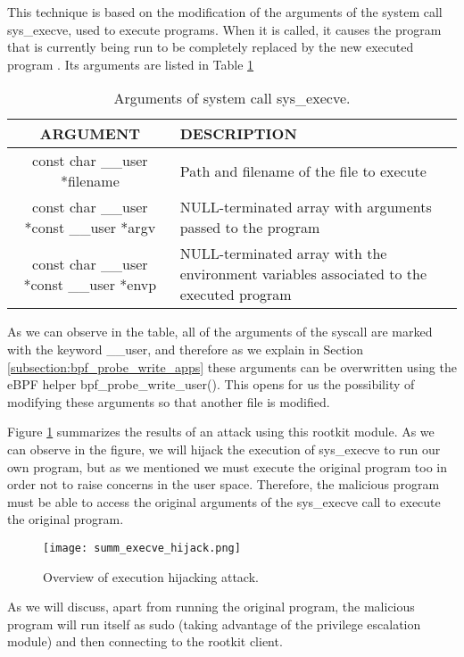 This technique is based on the modification of the arguments of the system call sys\_execve, used to execute programs. When it is called, it causes the program that is currently being run to be completely replaced by the new executed program \cite{execve_man}. Its arguments are listed in Table \ref{table:execve_args}

\begin{table}[htbp]
\begin{tabular}{|c|>{\centering\arraybackslash}p{7cm}|}
\hline
\textbf{ARGUMENT} & \textbf{DESCRIPTION}\\
\hline
\hline
const char \_\_user *filename & Path and filename of the file to execute\\
\hline
const char \_\_user *const \_\_user *argv & NULL-terminated array with arguments passed to the program\\
\hline
const char \_\_user *const \_\_user *envp & NULL-terminated array with the environment variables associated to the executed program \cite{environ}\\
\hline
\end{tabular}
\caption{Arguments of system call sys\_execve.}
\label{table:execve_args}
\end{table}

As we can observe in the table, all of the arguments of the syscall are marked with the keyword \_\_user, and therefore as we explain in Section \ref{subsection:bpf_probe_write_apps} these arguments can be overwritten using the eBPF helper bpf\_probe\_write\_user(). This opens for us the possibility of modifying these arguments so that another file is modified.

Figure \ref{fig:summ_execve_hijack} summarizes the results of an attack using this rootkit module. As we can observe in the figure, we will hijack the execution of sys\_execve to run our own program, but as we mentioned we must execute the original program too in order not to raise concerns in the user space. Therefore, the malicious program must be able to access the original arguments of the sys\_execve call to execute the original program.

\begin{figure}[htbp]
	\centering
	\texttt{[image: summ\_execve\_hijack.png]}
	\caption{Overview of execution hijacking attack.}
	\label{fig:summ_execve_hijack}
\end{figure}

As we will discuss, apart from running the original program, the malicious program will run itself as sudo (taking advantage of the privilege escalation module) and then connecting to the rootkit client.


